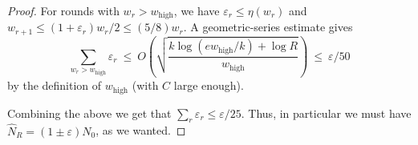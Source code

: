 \documentclass{article}
\renewcommand{\epsilon}{\varepsilon}
\DeclareMathOperator{\high}{\mathrm{high}}
\newcommand{\<}{\langle}
\renewcommand{\>}{\rangle}
\newcommand{\ignore}[1]{{}}
\begin{document}
\begin{proof}
For rounds with $w_r>w_{\high}$, we have $\epsilon_r\le \eta(w_r)$ and 
$w_{r+1}\le (1+\epsilon_r)w_r/2\le (5/8)w_r$. A geometric-series estimate gives
\[
\sum_{w_r>w_{\high}}\epsilon_r
\ \le\
O\!\left(\sqrt{\frac{k\log(e w_{\high}/k)+\log R}{w_{\high}}}\right)
\ \le\ \varepsilon/50
\]
by the definition of $w_{\high}$ (with $C$ large enough).

Combining the above we get that $\sum_r \epsilon_r \leq \varepsilon/25$. Thus, in particular we must have 
$\widehat{N}_R = (1 \pm \varepsilon) N_0$, as we wanted.

\ignore{
Let $W_r:=|S\cap U_r|$ be the true residual weight at round $r$.  
Define the estimator recursively:
\[
\widehat W_R:=|S\cap U_R|,
\qquad
\widehat W_r:=|S\cap I_r|+2\widehat W_{r+1}\quad (r=R-1,\dots,0).
\]
Then $\widehat W_0=\widehat{\mathrm{wt}}_{T,\alpha}(x)$.

Let $R_r:=S\cap V_r$, so $W_r=|S\cap I_r|+|R_r|$ and $W_{r+1}=|R_r\cap U_{r+1}|$.
If $W_r\le w_{\min}$ then $S\cap U_r\subseteq I_{r,\mathrm{tiny}}\subseteq I_r$, so $R_r=\emptyset$
and $W_{r+1}=0$ and $\widehat W_r=W_r$ exactly.

Otherwise, let dyadic $w$ satisfy $W_r\in(w,2w]$.
If $w\le w_{\high}$ then by the medium-regime guarantee we have
\[
\big|\,2W_{r+1}-|R_r|\,\big|\ \le\ \eta_0 w\ \le\ \eta_0 W_r.
\]
If $w>w_{\high}$ then by the large-regime guarantee we have
\[
\big|\,2W_{r+1}-|R_r|\,\big|\ \le\ \eta(w)\,w\ \le\ \eta(w)\,W_r.
\]
In either case we obtain
\begin{equation}\label{eq:eta_r_def_v2}
\big|\,2W_{r+1}-|R_r|\,\big|\ \le\ \eta_r\,W_r,
\qquad\text{where}\qquad
\eta_r:=\begin{cases}
0 & W_r\le w_{\min},\\
\eta_0 & w_{\min}<W_r\le w_{\high},\\
\eta(w) & W_r>w_{\high}.
\end{cases}
\end{equation}

\paragraph{Error propagation.}
Define $\xi_R:=0$ and for $r=R-1,\dots,0$ set
\[
\xi_r\ :=\ \eta_r+(1+\eta_r)\xi_{r+1}.
\]
We claim that for all $r$,
\begin{equation}\label{eq:xi_claim_v2}
(1-\xi_r)W_r\ \le\ \widehat W_r\ \le\ (1+\xi_r)W_r.
\end{equation}
We prove this by backward induction on $r$.
The base case $r=R$ holds since $\widehat W_R=W_R$ and $\xi_R=0$.

}
\end{proof}
\end{document}

